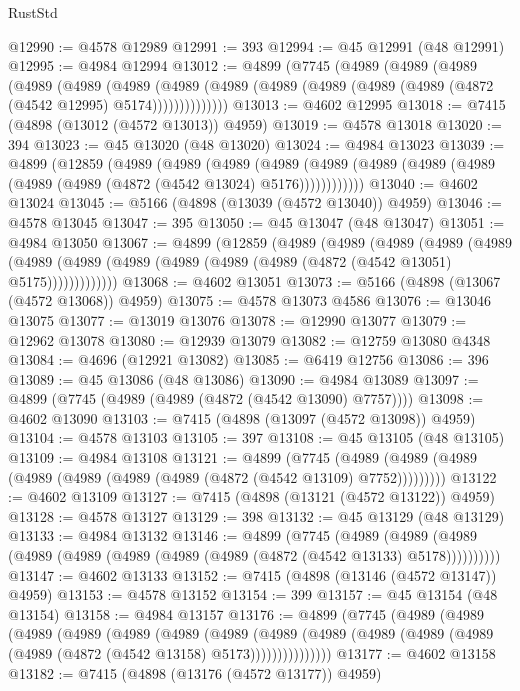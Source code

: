 \begin{lexlean}{RustStd}
\begin{coremodule}
@12990 := @4578 @12989
@12991 := 393
@12994 := @45 @12991 (@48 @12991)
@12995 := @4984 @12994
@13012 := @4899
    (@7745
      (@4989
        (@4989
          (@4989
            (@4989
              (@4989
                (@4989
                  (@4989
                    (@4989 (@4989 (@4989 (@4989 (@4989 (@4872 (@4542 @12995) @5174))))))))))))))
@13013 := @4602 @12995
@13018 := @7415 (@4898 (@13012 (@4572 @13013)) @4959)
@13019 := @4578 @13018
@13020 := 394
@13023 := @45 @13020 (@48 @13020)
@13024 := @4984 @13023
@13039 := @4899
    (@12859
      (@4989
        (@4989
          (@4989
            (@4989 (@4989 (@4989 (@4989 (@4989 (@4989 (@4989 (@4872 (@4542 @13024) @5176))))))))))))
@13040 := @4602 @13024
@13045 := @5166 (@4898 (@13039 (@4572 @13040)) @4959)
@13046 := @4578 @13045
@13047 := 395
@13050 := @45 @13047 (@48 @13047)
@13051 := @4984 @13050
@13067 := @4899
    (@12859
      (@4989
        (@4989
          (@4989
            (@4989
              (@4989
                (@4989 (@4989 (@4989 (@4989 (@4989 (@4989 (@4872 (@4542 @13051) @5175)))))))))))))
@13068 := @4602 @13051
@13073 := @5166 (@4898 (@13067 (@4572 @13068)) @4959)
@13075 := @4578 @13073 @4586
@13076 := @13046 @13075
@13077 := @13019 @13076
@13078 := @12990 @13077
@13079 := @12962 @13078
@13080 := @12939 @13079
@13082 := @12759 @13080 @4348
@13084 := @4696 (@12921 @13082)
@13085 := @6419 @12756
@13086 := 396
@13089 := @45 @13086 (@48 @13086)
@13090 := @4984 @13089
@13097 := @4899 (@7745 (@4989 (@4989 (@4872 (@4542 @13090) @7757))))
@13098 := @4602 @13090
@13103 := @7415 (@4898 (@13097 (@4572 @13098)) @4959)
@13104 := @4578 @13103
@13105 := 397
@13108 := @45 @13105 (@48 @13105)
@13109 := @4984 @13108
@13121 := @4899
    (@7745 (@4989 (@4989 (@4989 (@4989 (@4989 (@4989 (@4989 (@4872 (@4542 @13109) @7752)))))))))
@13122 := @4602 @13109
@13127 := @7415 (@4898 (@13121 (@4572 @13122)) @4959)
@13128 := @4578 @13127
@13129 := 398
@13132 := @45 @13129 (@48 @13129)
@13133 := @4984 @13132
@13146 := @4899
    (@7745
      (@4989 (@4989 (@4989 (@4989 (@4989 (@4989 (@4989 (@4989 (@4872 (@4542 @13133) @5178))))))))))
@13147 := @4602 @13133
@13152 := @7415 (@4898 (@13146 (@4572 @13147)) @4959)
@13153 := @4578 @13152
@13154 := 399
@13157 := @45 @13154 (@48 @13154)
@13158 := @4984 @13157
@13176 := @4899
    (@7745
      (@4989
        (@4989
          (@4989
            (@4989
              (@4989
                (@4989
                  (@4989
                    (@4989
                      (@4989 (@4989 (@4989 (@4989 (@4989 (@4872 (@4542 @13158) @5173)))))))))))))))
@13177 := @4602 @13158
@13182 := @7415 (@4898 (@13176 (@4572 @13177)) @4959)

\end{coremodule}
\end{lexlean}
